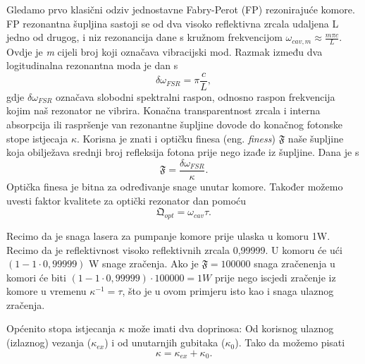 
Gledamo prvo klasični odziv jednostavne Fabry-Perot (FP) rezonirajuće komore. FP rezonantna šupljina sastoji se od dva visoko reflektivna
zrcala udaljena L jedno od drugog, i niz rezonancija dane s kružnom frekvencijom $\omega_{cav,m} \approx \frac{m\pi c}{L}$. Ovdje je \textit{m} cijeli broj koji označava
vibracijski mod. Razmak između dva logitudinalna rezonantna moda je dan s
\begin{equation}
	\delta\omega_{FSR} = \pi \frac{c}{L},
\end{equation}
gdje $\delta \omega_{FSR}$ označava slobodni spektralni raspon, odnosno raspon frekvencija kojim naš rezonator ne vibrira. Konačna transparentnost zrcala i
interna absorpcija ili raspršenje van rezonantne šupljine dovode do konačnog fotonske stope istjecaja $\kappa$. 
Korisna je znati i optičku finesa (eng. \textit{finess}) $\mathfrak{F}$ naše šupljine koja obilježava srednji broj refleksija fotona prije nego izađe iz šupljine. Dana je s 
\begin{equation}
	\mathfrak{F} = \frac{\delta\omega_{FSR}}{\kappa}.
\end{equation}
Optička finesa je bitna za određivanje snage unutar komore. Također možemo uvesti faktor kvalitete za optički rezonator dan pomoću
\begin{equation}
	\mathfrak{Q}_{opt} = \omega_{cav} \tau.
\end{equation}
\begin{Bilješka}
	Recimo da je snaga lasera za pumpanje komore prije ulaska u komoru 1W. Recimo da je reflektivnost visoko reflektivnih zrcala 0,99999.
	U komoru će ući $\left(1-1\cdot0,99999\right)$ W snage zračenja. Ako je $\mathfrak{F}=100000$ snaga zračenenja u komori će biti 
	$\left(1-1\cdot0,99999\right)\cdot 100000 = 1W$ prije nego iscjedi zračenje iz komore u vremenu $\kappa^{-1} = \tau$, što je u ovom primjeru isto kao i snaga ulaznog zračenja.
\end{Bilješka}
Općenito stopa istjecanja $\kappa$ može imati dva doprinosa: Od korisnog ulaznog (izlaznog) vezanja ($\kappa_{ex}$) i od unutarnjih gubitaka ($\kappa_0$). Tako da možemo pisati
\begin{equation}
	\kappa = \kappa_{ex} + \kappa_0.
\end{equation}

